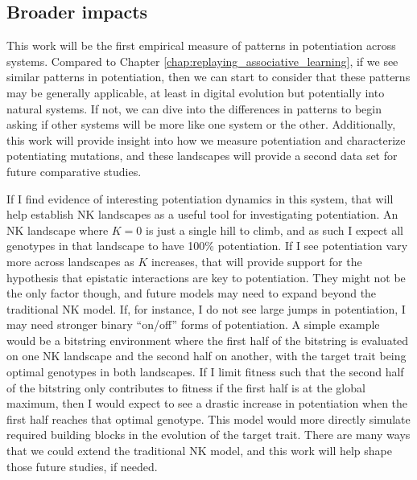 \subsection{Broader impacts}

This work will be the first empirical measure of patterns in potentiation across systems.
Compared to Chapter \ref{chap:replaying_associative_learning}, if we see similar patterns in potentiation, then we can start to consider that these patterns may be generally applicable, at least in digital evolution but potentially into natural systems. 
If not, we can dive into the differences in patterns to begin asking if other systems will be more like one system or the other. 
Additionally, this work will provide insight into how we measure potentiation and characterize potentiating mutations, and these landscapes will provide a second data set for future comparative studies. 


If I find evidence of interesting potentiation dynamics in this system, that will help establish NK landscapes as a useful tool for investigating potentiation. 
An NK landscape where $K = 0$ is just a single hill to climb, and as such I expect all genotypes in that landscape to have 100\% potentiation. 
If I see potentiation vary more across landscapes as $K$ increases, that will provide support for the hypothesis that epistatic interactions are key to potentiation. 
They might not be the only factor though, and future models may need to expand beyond the traditional NK model. 
If, for instance, I do not see large jumps in potentiation, I may need stronger binary ``on/off'' forms of potentiation. 
A simple example would be a bitstring environment where the first half of the bitstring is evaluated on one NK landscape and the second half on another, with the target trait being optimal genotypes in both landscapes. 
If I limit fitness such that the second half of the bitstring only contributes to fitness if the first half is at the global maximum, then I would expect to see a drastic increase in potentiation when the first half reaches that optimal genotype. 
This model would more directly simulate required building blocks in the evolution of the target trait. 
There are many ways that we could extend the traditional NK model, and this work will help shape those future studies, if needed. 

